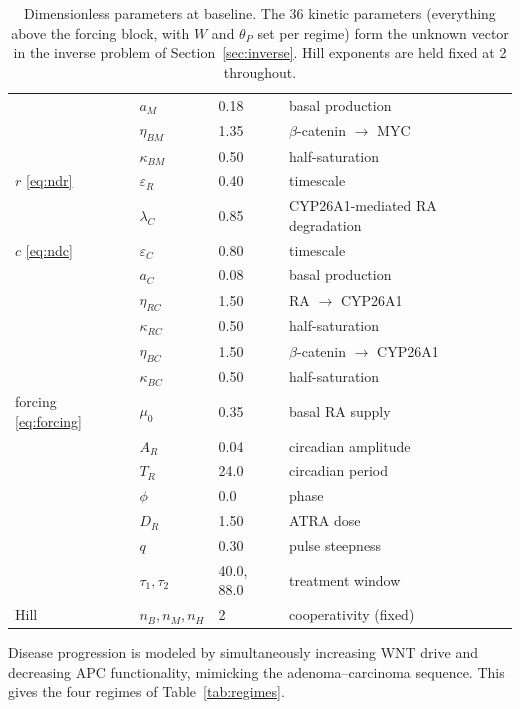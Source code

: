 \documentclass[11pt]{article}
\newcommand{\bcat}{$\beta$-\hspace{0pt}catenin}
\newcommand{\thP}{\theta_P}
\begin{document}
\begin{table}[H]
\begin{tabular}{llll}
  & $a_M$        & 0.18 & basal production \\
  & $\eta_{BM}$  & 1.35 & \bcat{} $\to$ MYC \\
  & $\kappa_{BM}$& 0.50 & half-saturation \\
\midrule
$r$ \eqref{eq:ndr}
  & $\varepsilon_R$ & 0.40 & timescale \\
  & $\lambda_C$  & 0.85 & CYP26A1-mediated RA degradation \\
\midrule
$c$ \eqref{eq:ndc}
  & $\varepsilon_C$ & 0.80 & timescale \\
  & $a_C$        & 0.08 & basal production \\
  & $\eta_{RC}$  & 1.50 & RA $\to$ CYP26A1 \\
  & $\kappa_{RC}$& 0.50 & half-saturation \\
  & $\eta_{BC}$  & 1.50 & \bcat{} $\to$ CYP26A1 \\
  & $\kappa_{BC}$& 0.50 & half-saturation \\
\midrule
forcing \eqref{eq:forcing}
  & $\mu_0$ & 0.35 & basal RA supply \\
  & $A_R$   & 0.04 & circadian amplitude \\
  & $T_R$   & 24.0 & circadian period \\
  & $\phi$  & 0.0  & phase \\
  & $D_R$   & 1.50 & ATRA dose \\
  & $q$     & 0.30 & pulse steepness \\
  & $\tau_1,\tau_2$ & 40.0, 88.0 & treatment window \\
\midrule
Hill & $n_B, n_M, n_H$ & 2 & cooperativity (fixed) \\
\bottomrule
\end{tabular}
\caption{Dimensionless parameters at baseline. The 36 kinetic parameters
(everything above the forcing block, with $W$ and $\thP$ set per regime) form
the unknown vector in the inverse problem of Section~\ref{sec:inverse}. Hill
exponents are held fixed at 2 throughout.}
\label{tab:params}
\end{table}

Disease progression is modeled by simultaneously increasing WNT drive and
decreasing APC functionality, mimicking the adenoma--carcinoma sequence. This
gives the four regimes of Table~\ref{tab:regimes}.
\end{document}
